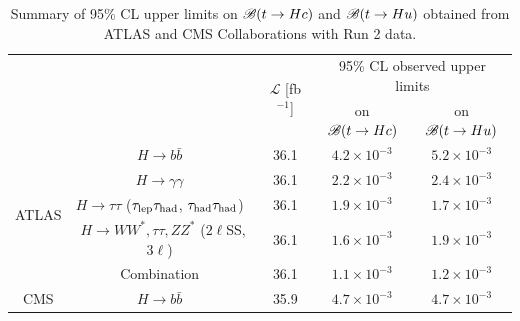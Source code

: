 \documentclass[PAPER, coverpage, atlasdraft=true, texlive=2016, UKenglish]{\ATLASLATEXPATH atlasdoc}
\providecommand{\DIFaddbeginFL}{} %
\providecommand{\DIFaddendFL}{} %
\providecommand{\DIFdelbeginFL}{} %
\providecommand{\DIFdelendFL}{} %
\begin{document}
\begin{table}[t!]
\caption{\DIFdelbeginFL %
\DIFdelendFL \DIFaddbeginFL \small{Summary of 95\% CL upper limits on $\mathscr{B}(t \to Hc)$ and $\mathscr{B}(t \to Hu)$ obtained from ATLAS and CMS Collaborations with Run 2 data.}\DIFaddendFL }
\begin{center}
\DIFdelbeginFL %
\DIFdelendFL \DIFaddbeginFL \small 
\DIFaddendFL \begin{tabular}{ccccc}
\toprule\toprule
& &\multirow{2}{*}{$\mathcal{L}$ [fb$^{-1}$]} & \DIFdelbeginFL %
\DIFdelendFL \DIFaddbeginFL \multicolumn{2}{c}{95\% CL observed upper limits}  \DIFaddendFL \\
& & 										    & \multicolumn{1}{c}{on $\mathscr{B}(t \to Hc)$}            & \multicolumn{1}{c}{on $\mathscr{B}(t \to Hu)$} \\
\midrule
\multirow{5}{*}{ATLAS}
& $H \to b\bar{b}$~\cite{fcnc36}                                          & 36.1         & $4.2 \times 10^{-3}$ & $5.2 \times 10^{-3}$ \\
& $H \to \gamma\gamma$~\cite{Aaboud:2017mfd}                              & 36.1         & $2.2 \times 10^{-3}$  & $2.4 \times 10^{-3}$  \\
& $H \to \tau\tau$ ($\tau_{\mathrm{lep}} \tau_{\mathrm{had}}$, $\tau_{\mathrm{had}} \tau_{\mathrm{had}}$)~\cite{fcnc36}                   & 36.1         & $1.9 \times 10^{-3}$  & $1.7 \times 10^{-3}$  \\ 
& $H \to WW^*, \tau\tau, ZZ^*$ ($2\ell$SS, $3\ell$)~\cite{Aaboud:2018pob} & 36.1         & $1.6 \times 10^{-3}$  & $1.9 \times 10^{-3}$\\ 
& Combination~\cite{fcnc36}                                               & 36.1         & $1.1 \times 10^{-3}$  & $1.2 \times 10^{-3}$  \\\midrule
\DIFdelbeginFL %
\DIFdelendFL \DIFaddbeginFL \multirow{1}{*}{CMS} 
\DIFaddendFL & $H \to b\bar{b}$~\cite{Sirunyan:2017uae}                                & 35.9         & $4.7 \times 10^{-3}$  & $4.7 \times 10^{-3}$  \\
% 
\DIFdelbeginFL %

\DIFdelendFL \bottomrule\bottomrule
\end{tabular}
\label{tab:limits_summary_ref}
\end{center}
\end{table}
\end{document}
